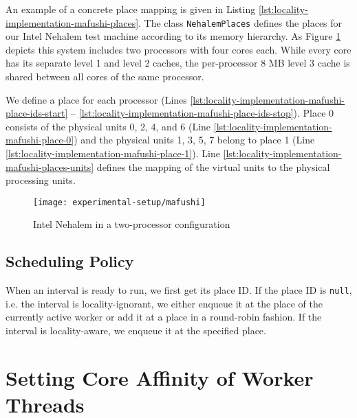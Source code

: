An example of a concrete place mapping is given in Listing
\ref{lst:locality-implementation-mafushi-places}. The class
\lstinline!NehalemPlaces! defines the places for our Intel Nehalem
test machine according to its memory hierarchy. As Figure
\ref{fig:locality-implemenation-work-stealing-places-mafushi} depicts
this system includes two processors with four cores each. While every
core has its separate level 1 and level 2 caches, the per-processor 8
MB level 3 cache is shared between all cores of the same processor.



We define a place for each processor (Lines
\ref{lst:locality-implementation-mafushi-place-ids-start} --
\ref{lst:locality-implementation-mafushi-place-ids-stop}). Place 0
consists of the physical units 0, 2, 4, and 6 (Line
\ref{lst:locality-implementation-mafushi-place-0}) and the physical
units 1, 3, 5, 7 belong to place 1 (Line
\ref{lst:locality-implementation-mafushi-place-1}). Line
\ref{lst:locality-implementation-mafushi-places-units} defines the
mapping of the virtual units to the physical processing units.

\begin{figure}[!htb]
  \centering
  \texttt{[image: experimental-setup/mafushi]}
  \caption[Intel Nehalem in a two-processor configuration]{Intel
    Nehalem in a two-processor configuration}
  \label{fig:locality-implemenation-work-stealing-places-mafushi}
\end{figure}

\subsection{Scheduling Policy}
\label{sec:locality-implementation-work-stealing-places-scheduling}

When an interval is ready to run, we first get its place ID. If the place ID is
\lstinline!null!, i.e. the interval is locality-ignorant, we either
enqueue it at the place of the currently active worker or add
it at a place in a round-robin fashion. If the interval is
locality-aware, we enqueue it at the specified place.


\section{Setting Core Affinity of Worker Threads}
\label{sec:locality-implementation-core-affinity}

